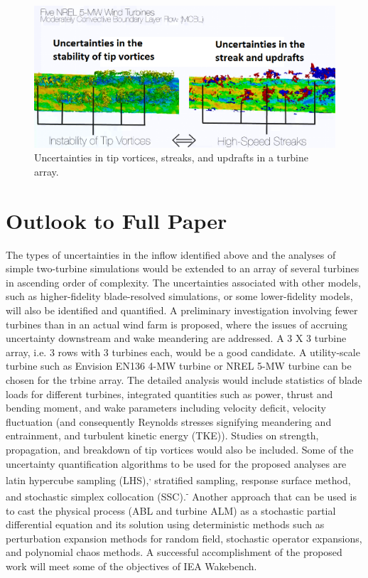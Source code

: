 \documentclass[]{aiaa-tc}%
\begin{document}
\begin{figure}
 \includegraphics[scale=0.25]{UQ2.png}
 \caption{Uncertainties in tip vortices, streaks, and updrafts in a turbine array.}
 \label{f:UQ2}
\end{figure}

\section{Outlook to Full Paper}

The types of uncertainties in the inflow identified above and the analyses of simple two-turbine simulations would be extended to an array of several turbines in ascending order of complexity. The uncertainties associated with other models, such as higher-fidelity blade-resolved simulations, or some lower-fidelity models, will also be identified and quantified. A preliminary investigation involving fewer turbines than in an actual wind farm is proposed, where the issues of accruing uncertainty downstream and wake meandering are addressed. A 3 X 3 turbine array, i.e. 3 rows with 3 turbines each, would be a good candidate. A utility-scale turbine such as Envision EN136 4-MW turbine or NREL 5-MW turbine can be chosen for the trbine array. The detailed analysis would include statistics of blade loads for different turbines, integrated quantities such as power, thrust and bending moment, and wake parameters including velocity deficit, velocity fluctuation (and consequently Reynolds stresses signifying meandering and entrainment, and turbulent kinetic energy (TKE)). Studies on strength, propagation, and breakdown of tip vortices would also be included. 
Some of the uncertainty quantification algorithms to be used for the proposed analyses are latin hypercube sampling (LHS),\cite{iman:wiley2008}\textsuperscript{, }\cite{helton:re2003} stratified sampling, response surface method, and stochastic simplex collocation (SSC).\cite{witterveen:aiaa2010}\textsuperscript{-}\cite{witterveen:jcp2013} Another approach that can be used is to cast the physical process (ABL and turbine ALM) as a stochastic partial differential equation and its solution using deterministic methods such as perturbation expansion methods for random field, stochastic operator expansions, and polynomial chaos methods.\cite{najm:arfm2009} A successful accomplishment of the proposed work will meet some of the objectives of IEA Wakebench.
\end{document}
